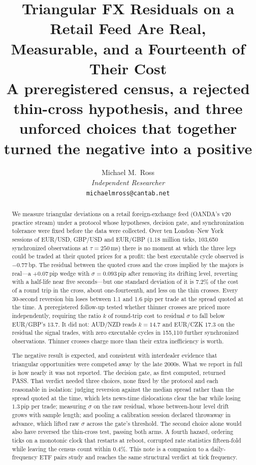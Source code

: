 \documentclass[11pt]{article}
\title{Triangular FX Residuals on a Retail Feed Are Real,\\
Measurable, and a Fourteenth of Their Cost\\[6pt]
\large A preregistered census, a rejected thin-cross hypothesis, and
three unforced choices that together turned the negative into a positive}
\author{Michael M.\ Ross\\
\textit{Independent Researcher}\\
\small \texttt{michaelmross@cantab.net}}
\begin{document}
\maketitle

\begin{abstract}
\noindent
We measure triangular deviations on a retail foreign-exchange feed
(OANDA's v20 practice stream) under a protocol whose hypotheses, decision
gate, and synchronization tolerance were fixed before the data were
collected. Over ten London--New York sessions of EUR/USD, GBP/USD and
EUR/GBP (1.18 million ticks, 103{,}650 synchronized observations at
$\tau = 250$\,ms) there is no moment at which the three legs could be
traded at their quoted prices for a profit: the best executable cycle
observed is $-0.77$\,bp. The residual between the quoted cross and the
cross implied by the majors is real---a $+0.07$\,pip wedge with
$\sigma = 0.093$\,pip after removing its drifting level, reverting with
a half-life near five seconds---but one standard deviation of it is
7.2\% of the cost of a round trip in the cross, about one-fourteenth,
and less on the thin crosses. Every 30-second reversion bin loses between 1.1 and 1.6 pip
per trade at the spread quoted at the time. A preregistered follow-up
tested whether thinner crosses are priced more independently, requiring
the ratio $k$ of round-trip cost to residual $\sigma$ to fall below
EUR/GBP's $13.7$. It did not: AUD/NZD reads $k = 14.7$ and EUR/CZK
$17.3$ on the residual the signal trades, with zero executable cycles
in 155{,}110 further synchronized observations. Thinner crosses charge
more than their extra inefficiency is worth.

The negative result is expected, and consistent with interdealer
evidence that triangular opportunities were competed away by the late
2000s. What we report in full is how nearly it was not reported. The
decision gate, as first computed, returned PASS. That verdict needed
three choices, none fixed by the protocol and each reasonable in
isolation: judging reversion against the median spread rather than the
spread quoted at the time, which lets news-time dislocations clear the
bar while losing $1.3$\,pip per trade; measuring $\sigma$ on the raw
residual, whose between-hour level drift grows with sample length; and
pooling a calibration session declared throwaway in advance, which
lifted raw $\sigma$ across the gate's threshold. The second choice
alone would also have reversed the thin-cross test, passing both
arms. A fourth hazard, ordering ticks on a monotonic clock that
restarts at reboot, corrupted rate statistics fifteen-fold while
leaving the census count within 0.4\%. This note is a companion to a
daily-frequency ETF pairs study \cite{ross2026} and reaches the same
structural verdict at tick frequency.
\end{abstract}
\end{document}
